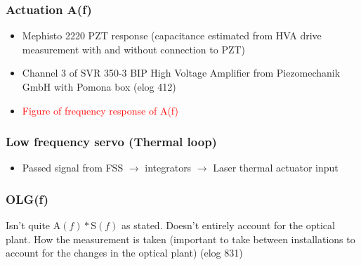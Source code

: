 \subsubsection{Actuation A(f)}
\begin{itemize}
\item Mephisto 2220 PZT response (capacitance estimated from HVA drive measurement with and without connection to PZT)
\item Channel 3 of SVR 350-3 BIP High Voltage Amplifier from Piezomechanik GmbH with Pomona box (elog 412)
\item \textcolor{red}{Figure of frequency response of A(f)}

\end{itemize}

\subsubsection{Low frequency servo (Thermal loop)}
\begin{itemize}
\item Passed signal from FSS $\rightarrow$ integrators $\rightarrow$ Laser thermal actuator input
\end{itemize}

\subsubsection{OLG(f)}
Isn't quite $\mathrm{A}(f)*\mathrm{S}(f)$ as stated. Doesn't entirely account for the optical plant.
How the measurement is taken (important to take between installations to account for the changes in the optical plant) (elog 831)


